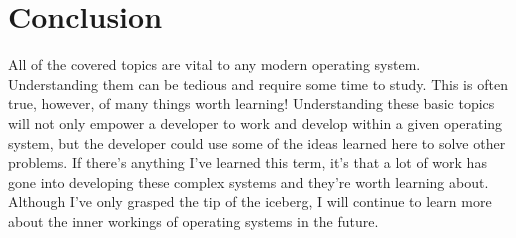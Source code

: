 \documentclass[10pt,letterpaper,onecolumn,draftclsnofoot]{IEEEtran}
\begin{document}
\section{Conclusion}
All of the covered topics are vital to any modern operating system. Understanding them can be tedious and require some time to study. This is often true, however, of many things worth learning! Understanding these basic topics will not only empower a developer to work and develop within a given operating system, but the developer could use some of the ideas learned here to solve other problems. If there's anything I've learned this term, it's that a lot of work has gone into developing these complex systems and they're worth learning about. Although I've only grasped the tip of the iceberg, I will continue to learn more about the inner workings of operating systems in the future.


\clearpage
\end{document}
